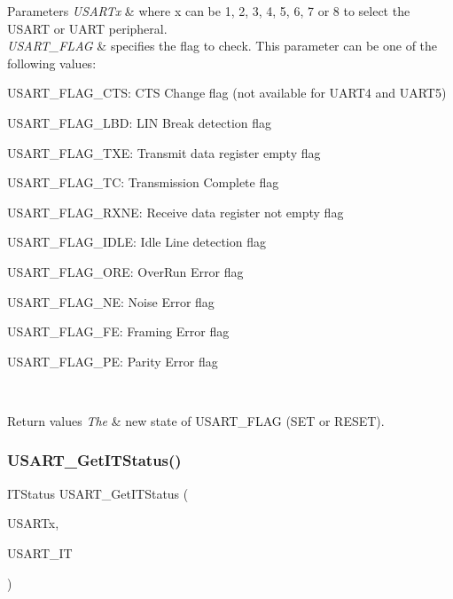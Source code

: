 \begin{DoxyParams}{Parameters}
{\em U\+S\+A\+R\+Tx} & where x can be 1, 2, 3, 4, 5, 6, 7 or 8 to select the U\+S\+A\+RT or U\+A\+RT peripheral. \\
\hline
{\em U\+S\+A\+R\+T\+\_\+\+F\+L\+AG} & specifies the flag to check. This parameter can be one of the following values\+: \begin{DoxyItemize}
\item U\+S\+A\+R\+T\+\_\+\+F\+L\+A\+G\+\_\+\+C\+TS\+: C\+TS Change flag (not available for U\+A\+R\+T4 and U\+A\+R\+T5) \item U\+S\+A\+R\+T\+\_\+\+F\+L\+A\+G\+\_\+\+L\+BD\+: L\+IN Break detection flag \item U\+S\+A\+R\+T\+\_\+\+F\+L\+A\+G\+\_\+\+T\+XE\+: Transmit data register empty flag \item U\+S\+A\+R\+T\+\_\+\+F\+L\+A\+G\+\_\+\+TC\+: Transmission Complete flag \item U\+S\+A\+R\+T\+\_\+\+F\+L\+A\+G\+\_\+\+R\+X\+NE\+: Receive data register not empty flag \item U\+S\+A\+R\+T\+\_\+\+F\+L\+A\+G\+\_\+\+I\+D\+LE\+: Idle Line detection flag \item U\+S\+A\+R\+T\+\_\+\+F\+L\+A\+G\+\_\+\+O\+RE\+: Over\+Run Error flag \item U\+S\+A\+R\+T\+\_\+\+F\+L\+A\+G\+\_\+\+NE\+: Noise Error flag \item U\+S\+A\+R\+T\+\_\+\+F\+L\+A\+G\+\_\+\+FE\+: Framing Error flag \item U\+S\+A\+R\+T\+\_\+\+F\+L\+A\+G\+\_\+\+PE\+: Parity Error flag \end{DoxyItemize}
\\
\hline
\end{DoxyParams}

\begin{DoxyRetVals}{Return values}
{\em The} & new state of U\+S\+A\+R\+T\+\_\+\+F\+L\+AG (S\+ET or R\+E\+S\+ET). \\
\hline
\end{DoxyRetVals}
\mbox{\label{group___u_s_a_r_t_ga93d8f031241bcdbe938d091a85295445}} 
\subsubsection{\texorpdfstring{U\+S\+A\+R\+T\+\_\+\+Get\+I\+T\+Status()}{USART\_GetITStatus()}}
{\footnotesize\ttfamily I\+T\+Status U\+S\+A\+R\+T\+\_\+\+Get\+I\+T\+Status (\begin{DoxyParamCaption}\item[{U\+S\+A\+R\+T\+\_\+\+Type\+Def $\ast$}]{U\+S\+A\+R\+Tx,  }\item[{uint16\+\_\+t}]{U\+S\+A\+R\+T\+\_\+\+IT }\end{DoxyParamCaption})}



